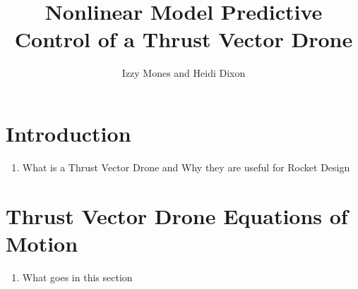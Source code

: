 \documentclass[]{article}
\title{Nonlinear Model Predictive Control  of a Thrust Vector Drone}
\author{Izzy Mones and Heidi Dixon}
\begin{document}
	\maketitle
	
	\section*{Introduction}	
	\begin{enumerate}
		\item What is a Thrust Vector Drone and Why they are useful for Rocket Design
	\end{enumerate}
	

	
	\section*{Thrust Vector Drone Equations of Motion}
	
	\begin{enumerate}
		\item What goes in this section
	\end{enumerate}	
	
\end{document}
